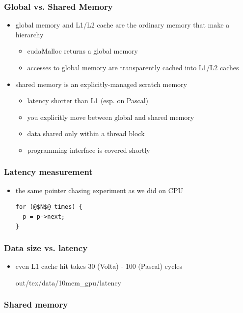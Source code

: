 \documentclass[12pt,dvipdfmx]{beamer}
\begin{document}
\begin{frame}[fragile]
  \frametitle{Global vs. Shared Memory}
  \begin{itemize}
  \item global memory and L1/L2 cache are the
    ordinary memory that make a hierarchy
    \begin{itemize}
    \item cudaMalloc returns a global memory
    \item accesses to global memory are
      transparently cached into L1/L2 caches
    \end{itemize}
  \item shared memory is an explicitly-managed scratch memory
    \begin{itemize}
    \item latency shorter than L1 (esp. on Pascal)
    \item you explicitly move between global and shared memory
    \item data shared only within a thread block
    \item programming interface is covered shortly
    \end{itemize}
  \end{itemize}
\end{frame}

\begin{frame}[fragile]
  \frametitle{Latency measurement}
  \begin{itemize}
  \item the same pointer chasing experiment as we did on CPU
\begin{lstlisting}
for (@$N$@ times) {
  p = p->next;
}
\end{lstlisting}

\begin{center}
\def\svgwidth{0.6\textwidth}
{\scriptsize }
\end{center}
\end{itemize}
\end{frame}

\begin{frame}[fragile]
  \frametitle{Data size vs. latency}
  \begin{itemize}
  \item even L1 cache hit takes 30 (Volta) - 100 (Pascal) cycles

\begin{center}
out/tex/data/10mem\_gpu/latency
\end{center}
    
  \end{itemize}
\end{frame}


\begin{frame}[fragile]
  \frametitle{Shared memory}

\end{frame}

\end{document}
